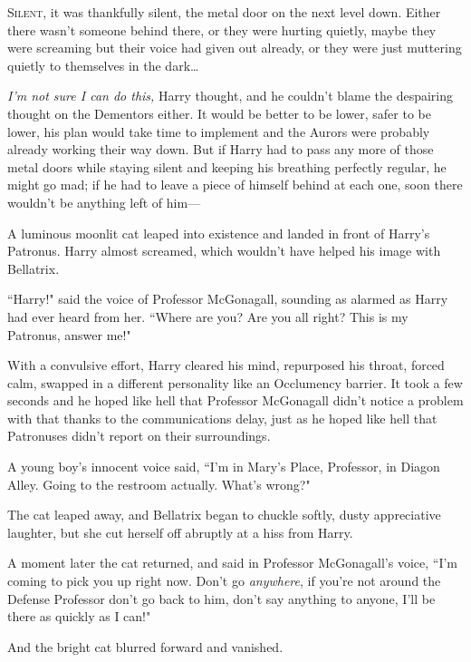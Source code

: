 
\lettrine{S}{ilent}, it was thankfully silent, the metal door on the next level down. Either there wasn't someone behind there, or they were hurting quietly, maybe they were screaming but their voice had given out already, or they were just muttering quietly to themselves in the dark{\ldots}

\emph{I'm not sure I can do this,} Harry thought, and he couldn't blame the despairing thought on the Dementors either. It would be better to be lower, safer to be lower, his plan would take time to implement and the Aurors were probably already working their way down. But if Harry had to pass any more of those metal doors while staying silent and keeping his breathing perfectly regular, he might go mad; if he had to leave a piece of himself behind at each one, soon there wouldn't be anything left of him—

A luminous moonlit cat leaped into existence and landed in front of Harry's Patronus. Harry almost screamed, which wouldn't have helped his image with Bellatrix.

``Harry!" said the voice of Professor McGonagall, sounding as alarmed as Harry had ever heard from her. ``Where are you? Are you all right? This is my Patronus, answer me!"

With a convulsive effort, Harry cleared his mind, repurposed his throat, forced calm, swapped in a different personality like an Occlumency barrier. It took a few seconds and he hoped like hell that Professor McGonagall didn't notice a problem with that thanks to the communications delay, just as he hoped like hell that Patronuses didn't report on their surroundings.

A young boy's innocent voice said, ``I'm in Mary's Place, Professor, in Diagon Alley. Going to the restroom actually. What's wrong?"

The cat leaped away, and Bellatrix began to chuckle softly, dusty appreciative laughter, but she cut herself off abruptly at a hiss from Harry.

A moment later the cat returned, and said in Professor McGonagall's voice, ``I'm coming to pick you up right now. Don't go \emph{anywhere}, if you're not around the Defense Professor don't go back to him, don't say anything to anyone, I'll be there as quickly as I can!"

And the bright cat blurred forward and vanished.

